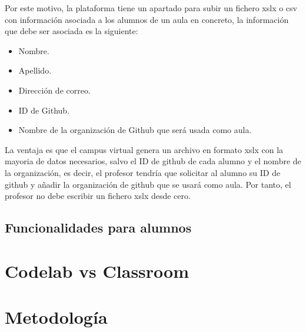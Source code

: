 Por este motivo, la plataforma tiene un apartado para subir un fichero xslx o csv con información asociada a los alumnos de un aula en concreto, la información que debe ser asociada es la siguiente:

\begin{itemize}
  \item Nombre.
  \item Apellido.
  \item Dirección de correo.
  \item ID de Github.
  \item Nombre de la organización de Github que será usada como aula.
\end{itemize}

La ventaja es que el campus virtual genera un archivo en formato xslx con la mayoria de datos necesarios, salvo el ID de github de cada alumno y el nombre de la organización, es decir, el profesor tendría que solicitar al alumno su ID de github y añadir la organización de github que se usará como aula.
Por tanto, el profesor no debe escribir un fichero xslx desde cero.

\subsection{Funcionalidades para alumnos}
\label{3:6:3}


\section{Codelab vs Classroom}
\label{:sec7}


\section{Metodología}
\label{:sec8}

